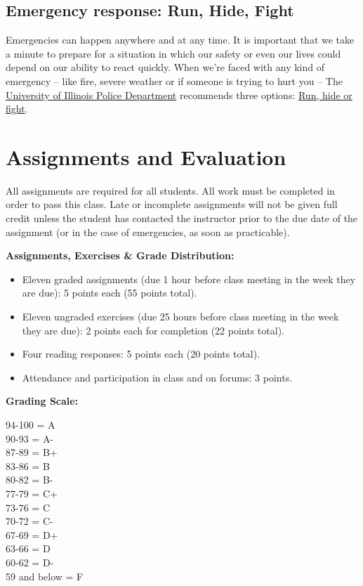 \documentclass[]{article}
\providecommand{\tightlist}{%
  \setlength{\itemsep}{0pt}\setlength{\parskip}{0pt}}
\begin{document}
\subsection{Emergency response: Run, Hide,
Fight}\label{emergency-response-run-hide-fight}

Emergencies can happen anywhere and at any time. It is important that we
take a minute to prepare for a situation in which our safety or even our
lives could depend on our ability to react quickly. When we're faced
with any kind of emergency -- like fire, severe weather or if someone is
trying to hurt you -- The
\href{http://police.illinois.edu/safe}{University of Illinois Police
Department} recommends three options:
\href{http://police.illinois.edu/dpsapp/wp-content/uploads/2016/08/syllabus-attachment.pdf}{Run,
hide or fight}.

\section{Assignments and Evaluation}\label{assignments-and-evaluation}

All assignments are required for all students. All work must be
completed in order to pass this class. Late or incomplete assignments
will not be given full credit unless the student has contacted the
instructor prior to the due date of the assignment (or in the case of
emergencies, as soon as practicable).

\textbf{Assignments, Exercises \& Grade Distribution:}

\begin{itemize}
\tightlist
\item
  Eleven graded assignments (due 1 hour before class meeting in the week
  they are due): 5 points each (55 points total).
\item
  Eleven ungraded exercises (due 25 hours before class meeting in the
  week they are due): 2 points each for completion (22 points total).
\item
  Four reading responses: 5 points each (20 points total).
\item
  Attendance and participation in class and on forums: 3 points.
\end{itemize}

\textbf{Grading Scale:}

94-100 = A\\
90-93 = A-\\
87-89 = B+\\
83-86 = B\\
80-82 = B-\\
77-79 = C+\\
73-76 = C\\
70-72 = C-\\
67-69 = D+\\
63-66 = D\\
60-62 = D-\\
59 and below = F
\end{document}
